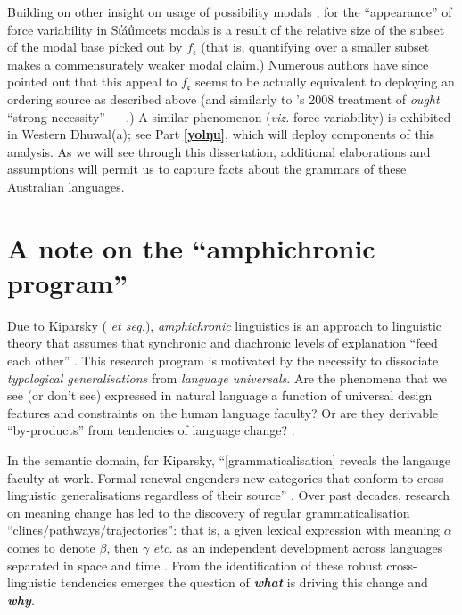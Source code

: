 \documentclass[11pt,dvipsnames]{report}
\begin{document}
Building on other insight on usage of possibility modals \citep[notably][]{Klinedinst2007}, for \citet{Rullmann2008} the ``appearance'' of force variability in St̓át̓imcets modals is a result of the relative size of the subset of the modal base picked out by $ f_{\mathfrak c} $ (that is, quantifying over a smaller subset makes a commensurately weaker modal claim.) Numerous authors have since pointed out that this appeal to $ f_{\mathfrak c} $ seems to be actually equivalent to deploying an ordering source as described above (and similarly to \citeauthor{VonFintel2008}'s 2008 treatment of \textit{ought} ``strong necessity'' --- \citealp[see][]{Portner2009,Matthewson2010,Peterson2008}.)
 A similar phenomenon (\textit{viz.} force variability) is exhibited in Western Dhuwal(a); see Part \textbf{\ref{yolŋu}}, which will deploy components of this analysis. As we will see through this dissertation, additional elaborations and assumptions will permit us to capture facts about the grammars of these Australian languages.

\section{A note on the ``amphichronic program''}\label{amph}

Due to Kiparsky (\citeyear{Kiparsky2006} \textit{et seq.}), \textit{amphichronic} linguistics is an approach to linguistic theory that assumes that synchronic and diachronic levels of explanation ``feed each other'' \citep[see also][]{Bermudez-Otero2013}. This research program is motivated by the necessity to dissociate \textit{typological generalisations} from \textit{language universals}. Are the phenomena that we see (or don't see) expressed in natural language a function of universal design features and constraints on the human language faculty? Or are they derivable ``by-products'' from tendencies of language change? \citep[see also][]{Anderson2008,Anderson2016a}.%

In the semantic domain, for Kiparsky, ``[grammaticalisation] reveals the langauge faculty at work. Formal renewal engenders new categories that conform to cross-linguistic generalisations regardless of their source'' \citep[73]{Kiparsky2015}. Over past decades, research on meaning change has led to the discovery of regular grammaticalisation ``clines\slash pathways\slash trajectories'': that is, a given lexical expression with meaning $ \alpha $ comes to denote $ \beta $, then $ \gamma $ \textit{etc.} as an independent development across languages separated in space and time \citep[see][]{Deo2015,Eckardt2011}. From the identification of these robust cross-linguistic tendencies emerges the question of \textbf{\textit{what}} is driving this change and \textbf{\textit{why}}.
\end{document}
